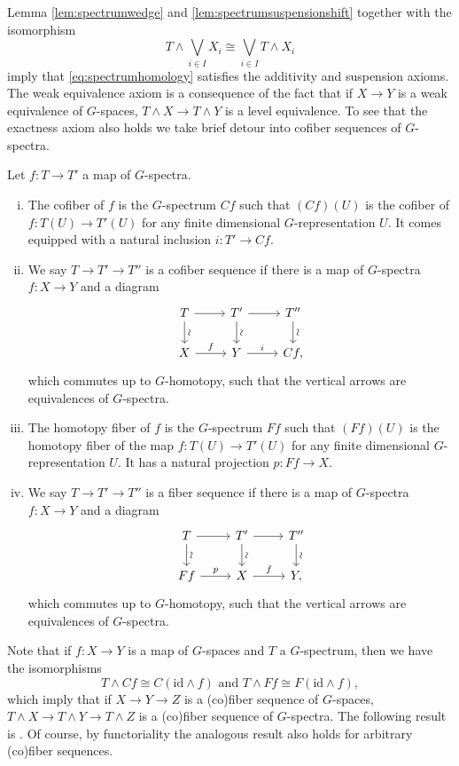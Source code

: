 Lemma \ref{lem:spectrumwedge} and \ref{lem:spectrumsuspensionshift} together with the isomorphism
\[
T\wedge \bigvee_{i\in I} X_i\cong \bigvee_{i\in I} T\wedge X_i
\] imply that \eqref{eq:spectrumhomology} satisfies the additivity and suspension axioms. The weak equivalence axiom
is a consequence of the fact that if $X\to Y$ is a weak equivalence of $G$-spaces,
$T\wedge X\to T\wedge Y$ is a level equivalence. To see that the exactness
axiom also holds we take brief detour into cofiber sequences of $G$-spectra.

\begin{mydef}
Let $f:T\to T'$ a map of $G$-spectra.
\begin{enumerate}[(i)]
\item The cofiber of $f$ is the $G$-spectrum $Cf$ such that 
$(Cf)(U)$ is the cofiber of $f:T(U)\to T'(U)$ for
any finite dimensional $G$-representation $U$.
It comes equipped with a natural inclusion 
$i:T'\to Cf$.
\item We say $T\to T'\to T''$ is a cofiber sequence
if there is a map of $G$-spectra $f:X\to Y$
and a diagram
\[
\begin{tikzcd}
T\arrow{r}\arrow{d}[anchor = center, rotate = 90, yshift = -1ex]{\sim}
&T' \arrow{d}[anchor = center, rotate = 90, yshift = -1ex]{\sim}\arrow{r}
&T''\arrow{d}[anchor = center, rotate = 90, yshift = -1ex]{\sim}\\
X\arrow{r}{f}
&Y\arrow{r}{i}
&Cf,
\end{tikzcd}
\]
which commutes up to $G$-homotopy, such that the vertical
arrows are equivalences of $G$-spectra.
\item The homotopy fiber of $f$ is the $G$-spectrum
$Ff$ such that $(Ff)(U)$ is the homotopy fiber of the map
$f:T(U)\to T'(U)$ for any finite dimensional $G$-representation $U$.
It has a natural projection $p:Ff\to X$.
\item We say $T\to T'\to T''$ is a fiber sequence
if there is a map of $G$-spectra $f:X\to Y$
and a diagram
\[
\begin{tikzcd}
T\arrow{r}\arrow{d}[anchor = center, rotate = 90, yshift = -1ex]{\sim}
&T' \arrow{d}[anchor = center, rotate = 90, yshift = -1ex]{\sim}\arrow{r}
&T''\arrow{d}[anchor = center, rotate = 90, yshift = -1ex]{\sim}\\
Ff\arrow{r}{p}
&X\arrow{r}{f}
&Y,
\end{tikzcd}
\]
which commutes up to $G$-homotopy, such that the vertical
arrows are equivalences of $G$-spectra.
\end{enumerate}
\end{mydef}
Note that if $f:X\to Y$ is a map of $G$-spaces and $T$ a $G$-spectrum,
then we have the isomorphisms 
\[
T\wedge Cf\cong C(\mathrm{id}\wedge f) \text{ and } T\wedge Ff\cong F(\mathrm{id}\wedge f),
\]
which imply that if $X\to Y\to Z$ is a (co)fiber sequence of $G$-spaces,
$T\wedge X\to T\wedge Y\to T\wedge Z$ is a (co)fiber sequence of $G$-spectra.
The following result is \cite[Theorem~III.3.5, \pno~45]{mandellmay}.
Of course, by functoriality the analogous result also holds for arbitrary (co)fiber
sequences.

